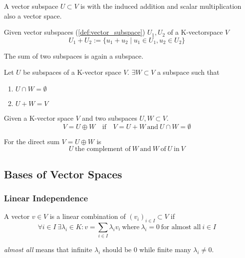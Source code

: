 \begin{theorem}[Subspace = Vector Space]\label{thm:subspace=vecspace}
   A vector subspace \(U \subset V\) is with the induced addition and scalar multiplication also a vector space.
\end{theorem}

\begin{definition}\label{def:subspace_sum}
   Given vector subspaces (\ref{def:vector_subspace}) \(U_1, U_2\) of a K-vectorspace \(V\)
   \[U_1 + U_2 := \{u_1 + u_2 \mid u_1 \in U_1, u_2 \in U_2\}\]
\end{definition}
\begin{remark}
   The sum of two subspaces is again a subspace.
\end{remark}

\begin{lemma}\label{lem:vectorspace_complement}
   Let \(U\) be subspaces of a K-vector space \(V\).
   \(\exists W \subset V\) a subspace such that
   \begin{enumerate}[label=\roman*, align=Center]
      \item \(U \cap W = \emptyset\)
      \item \(U + W = V\)
   \end{enumerate}
\end{lemma}

\begin{definition}\label{def:direct_sum}
   Given a K-vector space \(V\) and two subspaces \(U, W \subset V\).
   \[V = U \oplus W \quad\text{if}\quad V = U + W~\text{and}~U \cap W = \emptyset\]
\end{definition}

\begin{definition}\label{def:complement}
   For the direct sum \(V = U \oplus W\) is
   \[U~\text{the complement of}~W~\text{and}~W~\text{of}~U~\text{in}~V\]
\end{definition}

\subsection{Bases of Vector Spaces}
\subsubsection{Linear Independence}
\begin{definition}\label{def:lin_comb}
   A vector \(v \in V\) is a linear combination of \((v_i)_{i \in I} \subset V\) if
   \[\forall i \in I~\exists \lambda_i \in K: v = \sum_{i \in I} \lambda_i v_i~\text{where}~\lambda_i = 0~\text{for almost all}~i \in I\]
\end{definition}
\begin{remark}
   \textit{almost all} means that infinite \(\lambda_i\) should be 0 while finite many \(\lambda_i \neq 0\).
\end{remark}

